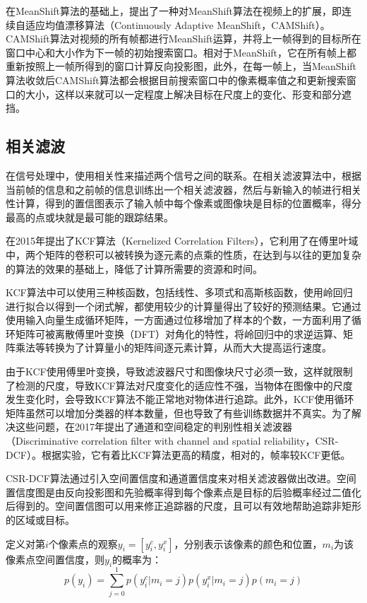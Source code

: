   在MeanShift算法的基础上，\citet{bradski1998computer}提出了一种对MeanShift算法在视频上的扩展，即连续自适应均值漂移算法（Continuously Adaptive MeanShift，CAMShift）。CAMShift算法对视频的所有帧都进行MeanShift运算，并将上一帧得到的目标所在窗口中心和大小作为下一帧的初始搜索窗口。相对于MeanShift，它在所有帧上都重新按照上一帧所得到的窗口计算反向投影图，此外，在每一帧上，当MeanShift算法收敛后CAMShift算法都会根据目前搜索窗口中的像素概率值之和更新搜索窗口的大小，这样以来就可以一定程度上解决目标在尺度上的变化、形变和部分遮挡。

\subsection{相关滤波}

  在信号处理中，使用相关性来描述两个信号之间的联系。在相关滤波算法中，根据当前帧的信息和之前帧的信息训练出一个相关滤波器，然后与新输入的帧进行相关性计算，得到的置信图表示了输入帧中每个像素或图像块是目标的位置概率，得分最高的点或块就是最可能的跟踪结果。

  \citet{henriques2015high}在2015年提出了KCF算法（Kernelized Correlation Filters），它利用了在傅里叶域中，两个矩阵的卷积可以被转换为逐元素的点乘的性质，在达到与以往的更加复杂的算法的效果的基础上，降低了计算所需要的资源和时间。

  KCF算法中可以使用三种核函数，包括线性、多项式和高斯核函数，使用岭回归进行拟合以得到一个闭式解，都使用较少的计算量得出了较好的预测结果。它通过使用输入向量生成循环矩阵，一方面通过位移增加了样本的个数，一方面利用了循环矩阵可被离散傅里叶变换（DFT）对角化的特性，将岭回归中的求逆运算、矩阵乘法等转换为了计算量小的矩阵间逐元素计算，从而大大提高运行速度。

  由于KCF使用傅里叶变换，导致滤波器尺寸和图像块尺寸必须一致，这样就限制了检测的尺度，导致KCF算法对尺度变化的适应性不强，当物体在图像中的尺度发生变化时，会导致KCF算法不能正常地对物体进行追踪。此外，KCF使用循环矩阵虽然可以增加分类器的样本数量，但也导致了有些训练数据并不真实。为了解决这些问题，\citet{lukezic2017discriminative}在2017年提出了通道和空间稳定的判别性相关滤波器（Discriminative correlation filter with channel and spatial reliability，CSR-DCF）。根据实验，它有着比KCF算法更高的精度，相对的，帧率较KCF更低。

  CSR-DCF算法通过引入空间置信度和通道置信度来对相关滤波器做出改进。空间置信度图是由反向投影图和先验概率得到每个像素点是目标的后验概率经过二值化后得到的。空间置信图可以用来修正追踪器的尺度，且可以有效地帮助追踪非矩形的区域或目标。

  定义对第$i$个像素点的观察$y_i=[y_i^c, y_i^x]$，分别表示该像素的颜色和位置，$m_i$为该像素点空间置信度，则$y_i$的概率为：
$$p(y_i)=\sum_{j=0}^1 p(y_i^c | m_i=j)p(y_i^x | m_i=j)p(m_i=j)$$

